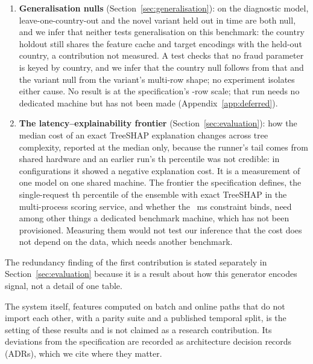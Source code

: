 \begin{enumerate}
        in any run measured, up to all \nFvTrainRows{} training rows. Changing only the corpus
        \nTrainUsed{} training rows were drawn from moved mean recall at the flag threshold across a
        range of \nSelMeanRange{}, which seed noise widens by an amount not measured, against \nFvSeedGainFixed{} from \nTrainUsed{} rows to all of them
        on one fixed corpus, with larger validation and calibration splits; at the false-positive budget corpus and volume moved it by similar
        amounts, and in AUC volume moved it more. All of these metrics were fixed in advance, though not blind to the test period; no interval was computed
        for these differences.
  \item \textbf{Generalisation nulls} (Section~\ref{sec:generalisation}): on the diagnostic model,
        leave-one-country-out and the novel variant held out in time are both null, and we infer that neither tests generalisation
        on this benchmark: the country holdout still shares the feature cache and target encodings
        with the held-out country, a contribution not measured. A test
        checks that no fraud parameter is keyed by country, and we infer that the country null
        follows from that and the variant null from the variant's multi-row shape; no experiment
        isolates either cause. No result is at the specification's \nSpecRows{}-row scale; that run
        needs no dedicated machine but has not been made (Appendix~\ref{app:deferred}).
  \item \textbf{The latency--explainability frontier} (Section~\ref{sec:evaluation}): how the
        median cost of an exact TreeSHAP explanation changes across tree complexity, reported at the
        median only, because the runner's tail comes from shared hardware and an earlier run's
        \nPctlTail{}th percentile was not credible: in
        \nFrontNegative{} configurations it showed a negative explanation cost. It is a measurement
        of one model on one shared machine. The frontier the specification defines, the single-request
        \nPctlTail{}th percentile of the ensemble with exact TreeSHAP in the multi-process scoring
        service, and whether the \nLatencyPNineNineShap{}~ms constraint binds, need among other things
        a dedicated benchmark machine, which has not been provisioned. Measuring them would not test
        our inference that the cost does not depend on the data, which needs another benchmark.
\end{enumerate}
The redundancy finding of the first contribution is stated separately in Section~\ref{sec:evaluation} because it is
a result about how this generator encodes signal, not a detail of one table.

The system itself, \nFeatures{} features computed on batch and online paths that do not import each other, with a parity suite and
a published temporal split, is the setting of these results and is not claimed as a research
contribution. Its deviations from the specification are recorded as architecture decision records
(ADRs), which we cite where they matter.
